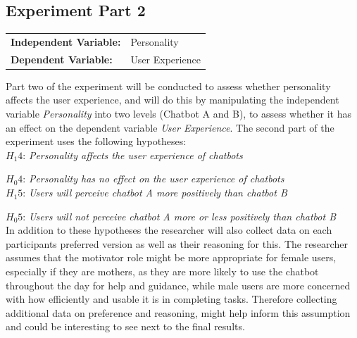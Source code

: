 \subsection{Experiment Part 2}

\vspace{2,5mm}

\begin{tabular}[h]{ l l }
    \textbf{Independent Variable:} & Personality \\ 
    \textbf{Dependent Variable:} & User Experience \\  
\end{tabular}
    
\vspace{2,5mm}

Part two of the experiment will be conducted to assess whether personality affects the user experience, and will do this by manipulating the independent variable \textit{Personality} into two levels (Chatbot A and B), to assess whether it has an effect on the dependent variable \textit{User Experience}. The second part of the experiment uses the following hypotheses:\\
    
    
    $H_1 4$: \textit{Personality affects the user experience of chatbots}
    
    $H_0 4$: \textit{Personality has no effect on the user experience of chatbots} \\
    
    $H_1 5$: \textit{Users will perceive chatbot A more positively than chatbot B} 
    
    $H_0 5$: \textit{Users will not perceive chatbot A more or less positively than chatbot B} \\
    
    In addition to these hypotheses the researcher will also collect data on each participants preferred version as well as their reasoning for this. The researcher assumes that the motivator role might be more appropriate for female users, especially if they are mothers, as they are more likely to use the chatbot throughout the day for help and guidance, while male users are more concerned with how efficiently and usable it is in completing tasks. Therefore collecting additional data on preference and reasoning, might help inform this assumption and could be interesting to see next to the final results.
    
    \vspace{5mm} %
    

